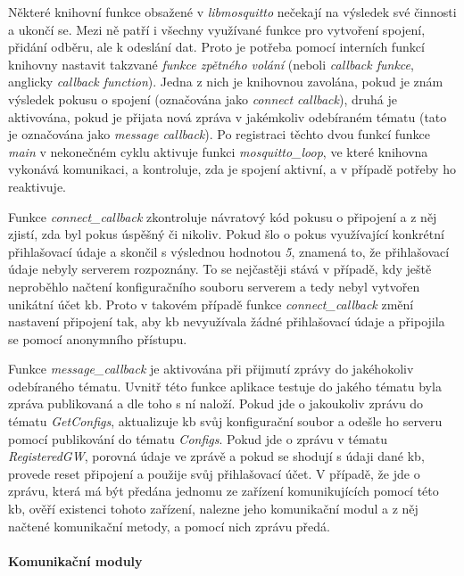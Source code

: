 Některé knihovní funkce obsažené v \emph{libmosquitto} nečekají na výsledek své činnosti a ukončí se. Mezi ně patří i všechny využívané funkce pro vytvoření spojení, přidání odběru, ale k odeslání dat. Proto je potřeba pomocí interních funkcí knihovny nastavit takzvané \emph{funkce zpětného volání} (neboli \emph{callback funkce}, anglicky \emph{callback function}). Jedna z nich je knihovnou zavolána, pokud je znám výsledek pokusu o spojení (označována jako \emph{connect callback}), druhá je aktivována, pokud je přijata nová zpráva v jakémkoliv odebíraném tématu (tato je označována jako \emph{message callback}). Po registraci těchto dvou funkcí funkce \emph{main} v nekonečném cyklu aktivuje funkci \emph{mosquitto\_loop}, ve které knihovna vykonává komunikaci, a kontroluje, zda je spojení aktivní, a v případě potřeby ho reaktivuje.

Funkce \emph{connect\_callback} zkontroluje návratový kód pokusu o připojení a z něj zjistí, zda byl pokus úspěšný či nikoliv. Pokud šlo o pokus využívající konkrétní přihlašovací údaje a skončil s výslednou hodnotou \emph{5}, znamená to, že přihlašovací údaje nebyly serverem rozpoznány. To se nejčastěji stává v případě, kdy ještě neproběhlo načtení konfiguračního souboru serverem a tedy nebyl vytvořen unikátní účet \acrshort{kb}. Proto v takovém případě funkce \emph{connect\_callback} změní nastavení připojení tak, aby \acrshort{kb} nevyužívala žádné přihlašovací údaje a připojila se pomocí anonymního přístupu.

Funkce \emph{message\_callback} je aktivována při přijmutí zprávy do jakéhokoliv odebíraného tématu. Uvnitř této funkce aplikace testuje do jakého tématu byla zpráva publikovaná a dle toho s ní naloží. Pokud jde o jakoukoliv zprávu do tématu \emph{GetConfigs}, aktualizuje \acrshort{kb} svůj konfigurační soubor a odešle ho serveru pomocí publikování do tématu \emph{Configs}. Pokud jde o zprávu v tématu \emph{RegisteredGW}, porovná údaje ve zprávě a pokud se shodují s údaji dané \acrshort{kb}, provede reset připojení a použije svůj přihlašovací účet. V případě, že jde o zprávu, která má být předána jednomu ze zařízení komunikujících pomocí této \acrshort{kb}, ověří existenci tohoto zařízení, nalezne jeho komunikační modul a z něj načtené komunikační metody, a pomocí nich zprávu předá.

\paragraph{Komunikační moduly} \hfill

